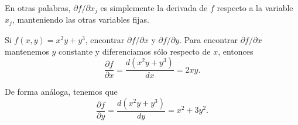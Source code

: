 En otras palabras, $\partial f / \partial x_{j}$ es simplemente la derivada de $f$ respecto a la variable $x_{j}$, manteniendo las otras variables fijas.

\begin{myExample}
    Si $f(x,y) = x^{2}y+y^{3}$, encontrar $\partial f / \partial x$ y $\partial f / \partial y$.
    Para encontrar $\partial f / \partial x$ mantenemos $y$ constante y diferenciamos sólo respecto de $x$, entonces
    $$ \frac{\partial f}{\partial x} = \frac{d(x^{2}y+y^{3})}{dx} = 2xy \text{.} $$

    De forma análoga, tenemos que
    $$ \frac{\partial f}{\partial y} = \frac{d(x^{2}y+y^{3})}{dy} = x^{2} + 3y^{2} \text{.} $$
\end{myExample}
